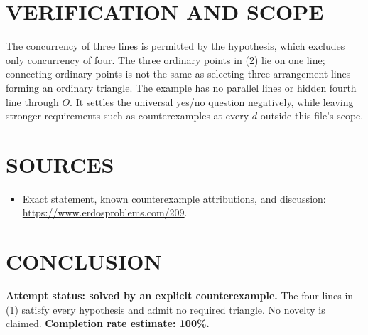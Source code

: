 \section{VERIFICATION AND SCOPE}
The concurrency of three lines is permitted by the hypothesis, which excludes only concurrency of four. The three ordinary points in (2) lie on one line; connecting ordinary points is not the same as selecting three arrangement lines forming an ordinary triangle. The example has no parallel lines or hidden fourth line through $O$. It settles the universal yes/no question negatively, while leaving stronger requirements such as counterexamples at every $d$ outside this file's scope.

\section{SOURCES}
\begin{itemize}
\item Exact statement, known counterexample attributions, and discussion: \url{https://www.erdosproblems.com/209}.
\end{itemize}
\section{CONCLUSION}
\textbf{Attempt status: solved by an explicit counterexample.} The four lines in (1) satisfy every hypothesis and admit no required triangle. No novelty is claimed.
\textbf{Completion rate estimate: 100\%.}
